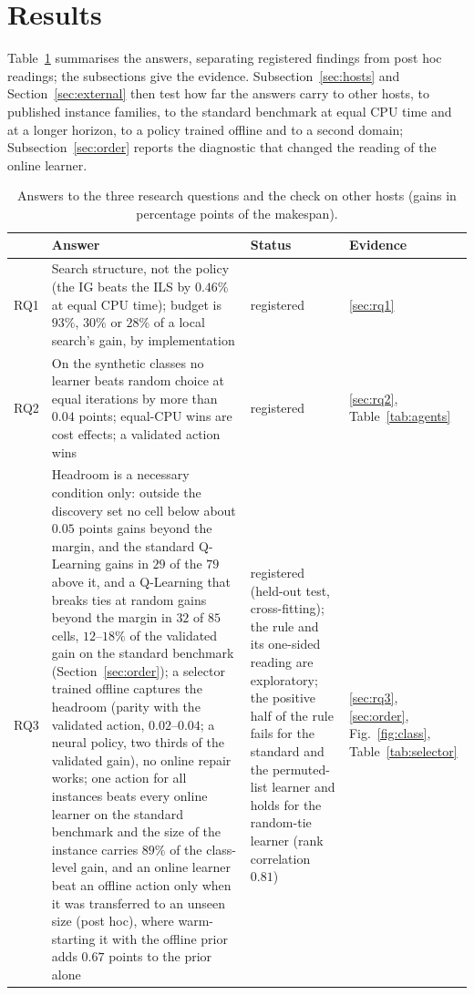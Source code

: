 \section{Results}
\label{sec:results}
Table~\ref{tab:answers} summarises the answers, separating registered findings from post hoc readings; the subsections give the evidence. Subsection~\ref{sec:hosts} and Section~\ref{sec:external} then test how far the answers carry to other hosts, to published instance families, to the standard benchmark at equal CPU time and at a longer horizon, to a policy trained offline and to a second domain; Subsection~\ref{sec:order} reports the diagnostic that changed the reading of the online learner.

\begin{table}[t]
\caption{Answers to the three research questions and the check on other hosts (gains in percentage points of the makespan).}
\label{tab:answers}
\centering
{\scriptsize\setlength{\tabcolsep}{3pt}
\begin{tabular}{@{}lp{7.0cm}p{2.8cm}l@{}}
\toprule
 & Answer & Status & Evidence \\
\midrule
RQ1 & Search structure, not the policy (the IG beats the ILS by $0.46\%$ at equal CPU time); budget is $93\%$, $30\%$ or $28\%$ of a local search's gain, by implementation & registered & \ref{sec:rq1} \\
RQ2 & On the synthetic classes no learner beats random choice at equal iterations by more than $0.04$ points; equal-CPU wins are cost effects; a validated action wins & registered & \ref{sec:rq2}, Table~\ref{tab:agents} \\
RQ3 & Headroom is a necessary condition only: outside the discovery set no cell below about $0.05$ points gains beyond the margin, and the standard Q-Learning gains in $29$ of the $79$ above it, and a Q-Learning that breaks ties at random gains beyond the margin in $32$ of $85$ cells, $12$--$18\%$ of the validated gain on the standard benchmark (Section~\ref{sec:order}); a selector trained offline captures the headroom (parity with the validated action, $0.02$--$0.04$; a neural policy, two thirds of the validated gain), no online repair works; one action for all instances beats every online learner on the standard benchmark and the size of the instance carries $89\%$ of the class-level gain, and an online learner beat an offline action only when it was transferred to an unseen size (post hoc), where warm-starting it with the offline prior adds $0.67$ points to the prior alone & registered (held-out test, cross-fitting); the rule and its one-sided reading are exploratory; the positive half of the rule fails for the standard and the permuted-list learner and holds for the random-tie learner (rank correlation $0.81$) & \ref{sec:rq3}, \ref{sec:order}, Fig.~\ref{fig:class}, Table~\ref{tab:selector} \\

\end{tabular}}
\end{table}
